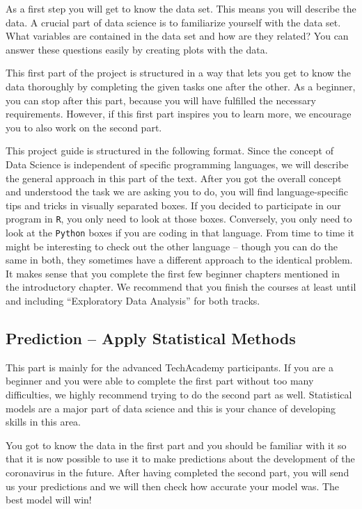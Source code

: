 \documentclass[
  11pt,
]{article}
\begin{document}
As a first step you will get to know the data set. This means you will describe the data. A crucial part of data science is to familiarize yourself with the data set. What variables are contained in the data set and how are they related? You can answer these questions easily by creating plots with the data.

This first part of the project is structured in a way that lets you get to know the data thoroughly by completing the given tasks one after the other. As a beginner, you can stop after this part, because you will have fulfilled the necessary requirements. However, if this first part inspires you to learn more, we encourage you to also work on the second part.

This project guide is structured in the following format. Since the concept of Data Science is independent of specific programming languages, we will describe the general approach in this part of the text. After you got the overall concept and understood the task we are asking you to do, you will find language-specific tips and tricks in visually separated boxes. If you decided to participate in our program in \texttt{R}, you only need to look at those boxes. Conversely, you only need to look at the \texttt{Python} boxes if you are coding in that language. From time to time it might be interesting to check out the other language -- though you can do the same in both, they sometimes have a different approach to the identical problem. It makes sense that you complete the first few beginner chapters mentioned in the introductory chapter. We recommend that you finish the courses at least until and including ``Exploratory Data Analysis'' for both tracks.

\hypertarget{prediction-apply-statistical-methods}{%
\subsection{Prediction -- Apply Statistical Methods}\label{prediction-apply-statistical-methods}}

This part is mainly for the advanced TechAcademy participants. If you are a beginner and you were able to complete the first part without too many difficulties, we highly recommend trying to do the second part as well. Statistical models are a major part of data science and this is your chance of developing skills in this area.

You got to know the data in the first part and you should be familiar with it so that it is now possible to use it to make predictions about the development of the coronavirus in the future. After having completed the second part, you will send us your predictions and we will then check how accurate your model was. The best model will win!
\end{document}
